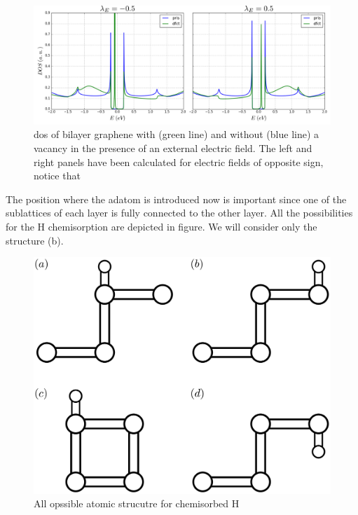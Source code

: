 \begin{figure}[h!]
\centering
\includegraphics{chapter06/figures/bilayer_dos_dfct.png}
\vspace{-5pt}
\caption{\ac{dos} of bilayer graphene with (green line) and without (blue line) a vacancy in the presence of an external electric field. The left and right panels have been calculated for electric fields of opposite sign, notice that }
\label{dos_bi_dfct}
\end{figure}
\FloatBarrier

















The position where the adatom is introduced now is important since one of the sublattices of each layer is fully connected to the other layer. All the possibilities for the H chemisorption are depicted in figure. We will consider only the structure (b).

\begin{figure}[h!]
\centering
\includegraphics{chapter06/figures/bilayer_H.pdf}
\vspace{-5pt}
\caption{All opssible atomic strucutre for chemisorbed H}
\end{figure}



